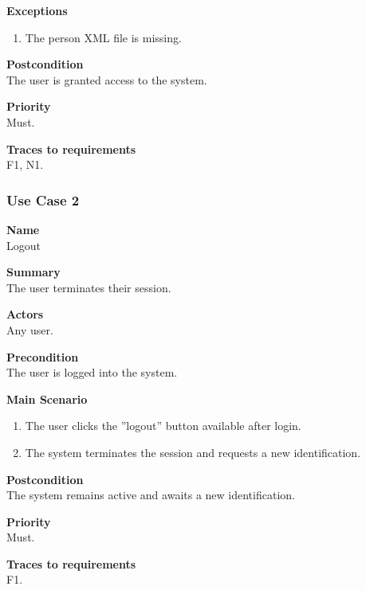 \documentclass[12pt]{article}
\begin{document}
\noindent
{\bf Exceptions}\\
\vspace*{-0.35in}
\begin{enumerate}
\item The person XML file is missing.
\end{enumerate}
\vspace*{-0.1in}

\noindent
{\bf Postcondition}\\
The user is granted access to the system.

\noindent
{\bf Priority}\\
Must.

\noindent
{\bf Traces to requirements}\\
F1, N1.

\subsubsection{Use Case 2} \label{uc:2}

\noindent
{\bf Name}\\
Logout

\noindent
{\bf Summary}\\
The user terminates their session.

\noindent
{\bf Actors}\\
Any user.

\noindent
{\bf Precondition}\\
The user is logged into the system.

\noindent
{\bf Main Scenario}\\
\vspace*{-0.35in}
\begin{enumerate}
\item The user clicks the ”logout” button available after login.
\vspace*{-0.1in}
\item The system terminates the session and requests a new identification.
\end{enumerate}
\vspace*{-0.1in}

\noindent
{\bf Postcondition}\\
The system remains active and awaits a new identification.

\noindent
{\bf Priority}\\
Must.

\noindent
{\bf Traces to requirements}\\
F1.
\end{document}
